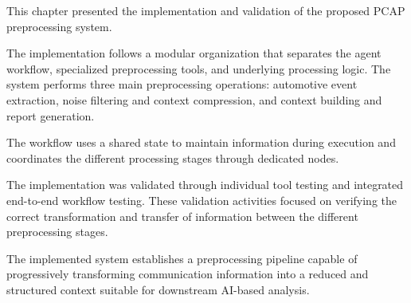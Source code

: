 This chapter presented the implementation and validation of the proposed PCAP preprocessing system.

The implementation follows a modular organization that separates the agent workflow, specialized preprocessing tools, and underlying processing logic. The system performs three main preprocessing operations: automotive event extraction, noise filtering and context compression, and context building and report generation.

The workflow uses a shared state to maintain information during execution and coordinates the different processing stages through dedicated nodes.

The implementation was validated through individual tool testing and integrated end-to-end workflow testing. These validation activities focused on verifying the correct transformation and transfer of information between the different preprocessing stages.

The implemented system establishes a preprocessing pipeline capable of progressively transforming communication information into a reduced and structured context suitable for downstream AI-based analysis.